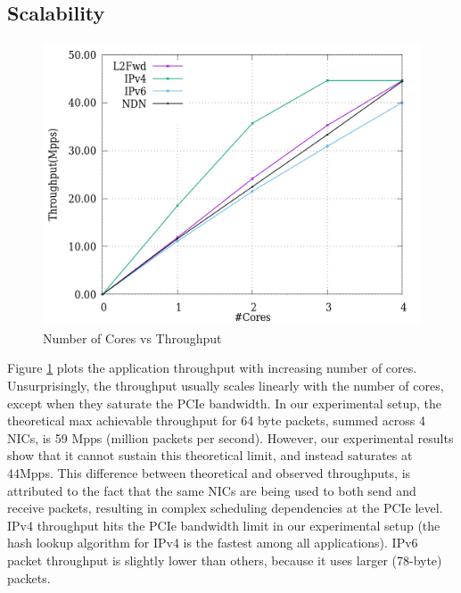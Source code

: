 \subsection{Scalability}
\label{scalability}
\begin{figure}[ht]
\includegraphics[width = \linewidth]{Figures/cores.png}
\caption{Number of Cores vs Throughput}
\label{cores}
\end{figure}
Figure \ref{cores} plots the application throughput with increasing number of cores.
Unsurprisingly, the throughput usually scales linearly with the number of cores, except when
they saturate the PCIe bandwidth. In our experimental setup, the theoretical max achievable
throughput for 64 byte packets, summed across 4 NICs, is 59 Mpps (million packets per second). However, our
experimental results show that it cannot sustain this theoretical limit, and instead
saturates at 44Mpps. This difference between theoretical and observed throughputs,
is attributed to the fact that the same NICs are being used to both send and
receive packets, resulting in complex scheduling dependencies at the PCIe level.
IPv4 throughput hits the PCIe bandwidth limit in our experimental setup (the hash
lookup algorithm for IPv4 is the fastest among all applications).
IPv6 packet throughput is slightly lower than others, because it uses larger
(78-byte) packets.

%

